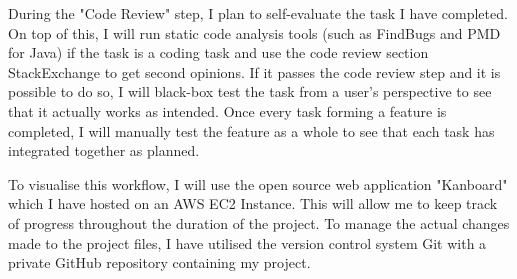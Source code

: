 \documentclass[]{report}
\begin{document}
		During the "Code Review" step, I plan to self-evaluate the task I have completed. On top of this, I will run static code analysis tools (such as FindBugs and PMD for Java) if the task is a coding task and use the code review section StackExchange to get second opinions. If it passes the code review step and it is possible to do so, I will black-box test the task from a user's perspective to see that it actually works as intended. Once every task forming a feature is completed, I will manually test the feature as a whole to see that each task has integrated together as planned.
		
		To visualise this workflow, I will use the open source web application "Kanboard" which I have hosted on an AWS EC2 Instance. This will allow me to keep track of progress throughout the duration of the project. To manage the actual changes made to the project files, I have utilised the version control system Git with a private GitHub repository containing my project.
		
\end{document}

